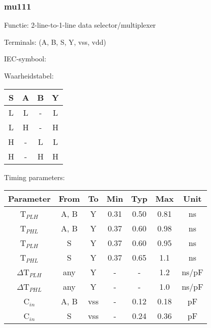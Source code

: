 \subsubsection{mu111}

Functie: 2-line-to-1-line data selector/multiplexer

Terminals: (A, B, S, Y, vss, vdd)


IEC-symbool:
\begin{figure}[bth]
\end{figure}

\begin{minipage}[t]{0.3\textwidth}
Waarheidstabel:\\

\begin{tabular}{|c|cc||c|}
\hline
S	&A	&B	&Y\\
\hline
L	&L	&-	&L\\
L	&H	&-	&H\\
H	&-	&L	&L\\
H	&-	&H	&H\\
\hline
\end{tabular}
\end{minipage}
\hfill
\begin{minipage}[t]{0.6\textwidth}
Timing parameters:\\

\begin{tabular}{|c|cc|ccc|c|}
\hline
Parameter               &From            &To   	&Min	&Typ	&Max    &Unit\\
\hline
T$_{PLH}$               &A, B     	&Y      &0.31	&0.50	&0.81    &ns\\
T$_{PHL}$               &A, B    	&Y      &0.37	&0.60	&0.98    &ns\\
T$_{PLH}$               &S         	&Y      &0.37	&0.60	&0.95    &ns\\
T$_{PHL}$               &S         	&Y      &0.37	&0.65	&1.1    &ns\\
\hline
$\Delta$T$_{PLH}$       &any           &Y      &-	&-	&1.2    &ns/pF\\
$\Delta$T$_{PHL}$       &any           &Y      &-	&-	&1.0    &ns/pF\\
\hline
C$_{in}$                &A, B    	&vss   &-	&0.12	&0.18   &pF\\
C$_{in}$                &S             	&vss   &-	&0.24	&0.36   &pF\\
\hline
\end{tabular}
\end{minipage}
\\

